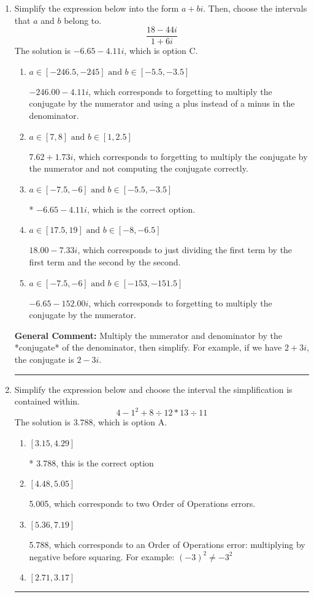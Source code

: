 \documentclass{extbook}[14pt]
\newcommand{\litem}[1]{\item #1

\rule{\textwidth}{0.4pt}}
\begin{document}
\begin{enumerate}\litem{
Simplify the expression below into the form $a+bi$. Then, choose the intervals that $a$ and $b$ belong to.
\[ \frac{18 - 44 i}{1 + 6 i} \]The solution is \( -6.65  - 4.11 i \), which is option C.\begin{enumerate}[label=\Alph*.]
\item \( a \in [-246.5, -245] \text{ and } b \in [-5.5, -3.5] \)

 $-246.00  - 4.11 i$, which corresponds to forgetting to multiply the conjugate by the numerator and using a plus instead of a minus in the denominator.
\item \( a \in [7, 8] \text{ and } b \in [1, 2.5] \)

 $7.62  + 1.73 i$, which corresponds to forgetting to multiply the conjugate by the numerator and not computing the conjugate correctly.
\item \( a \in [-7.5, -6] \text{ and } b \in [-5.5, -3.5] \)

* $-6.65  - 4.11 i$, which is the correct option.
\item \( a \in [17.5, 19] \text{ and } b \in [-8, -6.5] \)

 $18.00  - 7.33 i$, which corresponds to just dividing the first term by the first term and the second by the second.
\item \( a \in [-7.5, -6] \text{ and } b \in [-153, -151.5] \)

 $-6.65  - 152.00 i$, which corresponds to forgetting to multiply the conjugate by the numerator.
\end{enumerate}

\textbf{General Comment:} Multiply the numerator and denominator by the *conjugate* of the denominator, then simplify. For example, if we have $2+3i$, the conjugate is $2-3i$.
}
\litem{
Simplify the expression below and choose the interval the simplification is contained within.
\[ 4 - 1^2 + 8 \div 12 * 13 \div 11 \]The solution is \( 3.788 \), which is option A.\begin{enumerate}[label=\Alph*.]
\item \( [3.15, 4.29] \)

* 3.788, this is the correct option
\item \( [4.48, 5.05] \)

 5.005, which corresponds to two Order of Operations errors.
\item \( [5.36, 7.19] \)

 5.788, which corresponds to an Order of Operations error: multiplying by negative before squaring. For example: $(-3)^2 \neq -3^2$
\item \( [2.71, 3.17] \)


\end{enumerate}}
\end{enumerate}
\end{document}
